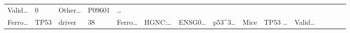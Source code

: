 \documentclass[
]{article}
\begin{document}
\begin{longtable}[]{@{}lllllllllllllll@{}}
\begin{minipage}[t]{0.05\columnwidth}
Valid\ldots{}\strut
\end{minipage} & \begin{minipage}[t]{0.05\columnwidth}\raggedright
0\strut
\end{minipage} & \begin{minipage}[t]{0.05\columnwidth}\raggedright
Other\ldots{}\strut
\end{minipage} & \begin{minipage}[t]{0.05\columnwidth}\raggedright
P09601\strut
\end{minipage} & \begin{minipage}[t]{0.02\columnwidth}\raggedright
\ldots{}\strut
\end{minipage}\tabularnewline
\begin{minipage}[t]{0.05\columnwidth}\raggedright
Ferro\ldots{}\strut
\end{minipage} & \begin{minipage}[t]{0.05\columnwidth}\raggedright
TP53\strut
\end{minipage} & \begin{minipage}[t]{0.04\columnwidth}\raggedright
driver\strut
\end{minipage} & \begin{minipage}[t]{0.02\columnwidth}\raggedright
38\strut
\end{minipage} & \begin{minipage}[t]{0.05\columnwidth}\raggedright
Ferro\ldots{}\strut
\end{minipage} & \begin{minipage}[t]{0.05\columnwidth}\raggedright
HGNC:\ldots{}\strut
\end{minipage} & \begin{minipage}[t]{0.05\columnwidth}\raggedright
ENSG0\ldots{}\strut
\end{minipage} & \begin{minipage}[t]{0.05\columnwidth}\raggedright
p53\^{}3\ldots{}\strut
\end{minipage} & \begin{minipage}[t]{0.05\columnwidth}\raggedright
Mice\strut
\end{minipage} & \begin{minipage}[t]{0.05\columnwidth}\raggedright
TP53 \ldots{}\strut
\end{minipage} & \begin{minipage}[t]{0.05\columnwidth}\raggedright
Valid\ldots{}\strut
\end{minipage} & \begin{minipage}[t]{0.05\columnwidth}\raggedright

\end{minipage}
\end{longtable}
\end{document}
